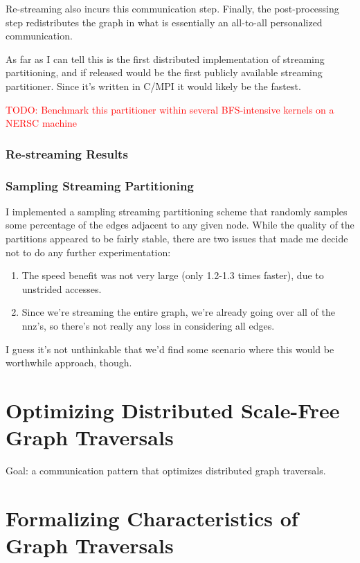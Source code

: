 \documentclass[11pt]{article}
\newcommand\warning[1]{\textcolor{red}{#1}}
\begin{document}
Re-streaming also incurs this communication step. Finally, the post-processing step redistributes the graph in what is essentially an all-to-all personalized communication. 

As far as I can tell this is the first distributed implementation of streaming partitioning, and if released would be the first publicly available streaming partitioner. Since it's written in C/MPI it would likely be the fastest. 

\warning{TODO: Benchmark this partitioner within several BFS-intensive kernels on a NERSC machine}

\subsubsection{Re-streaming Results}

\subsubsection{Sampling Streaming Partitioning}
I implemented a sampling streaming partitioning scheme that randomly samples some percentage of the edges adjacent to any given node. While the quality of the partitions appeared to be fairly stable, there are two issues that made me decide not to do any further experimentation:

\begin{enumerate}
\item The speed benefit was not very large (only 1.2-1.3 times faster), due to unstrided accesses. 
\item Since we're streaming the entire graph, we're already going over all of the nnz's, so there's not really any loss in considering all edges. \end{enumerate}

I guess it's not unthinkable that we'd find some scenario where this would be worthwhile approach, though.




\newpage \section{Optimizing Distributed Scale-Free Graph Traversals}
Goal: a communication pattern that optimizes distributed graph traversals.



\newpage \section{Formalizing Characteristics of Graph Traversals}
\end{document}
